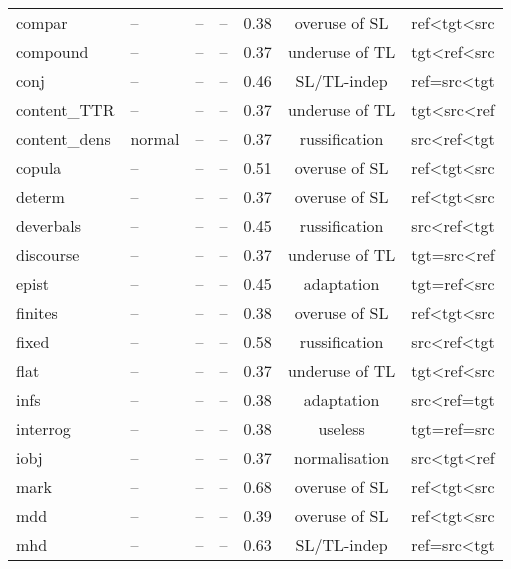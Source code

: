 \begin{longtable}{l|p{2cm}p{2cm}p{1.5cm}ccc}
	compar        & --     & --     & --    & 0.38 & overuse of SL  & ref\textless{}tgt\textless{}src \\
	compound      & --     & --     & --    & 0.37 & underuse of TL  & tgt\textless{}ref\textless{}src \\
	conj          & --     & --     & --    & 0.46 & SL/TL-indep    & ref=src\textless{}tgt           \\
	content\_TTR  & --     & --     & --    & 0.37 & underuse of TL & tgt\textless{}src\textless{}ref \\
	content\_dens & normal & --     & --    & 0.37 & russification  & src\textless{}ref\textless{}tgt \\
	copula        & --     & --     & --    & 0.51 & overuse of SL  & ref\textless{}tgt\textless{}src \\
	determ        & --     & --     & --    & 0.37 & overuse of SL  & ref\textless{}tgt\textless{}src \\
	deverbals     & --     & --     & --    & 0.45 & russification  & src\textless{}ref\textless{}tgt \\
	discourse     & --     & --     & --    & 0.37 & underuse of TL & tgt=src\textless{}ref           \\
	epist         & --     & --     & --    & 0.45 & adaptation     & tgt=ref\textless{}src           \\
	finites       & --     & --     & --    & 0.38 & overuse of SL  & ref\textless{}tgt\textless{}src \\
	fixed         & --     & --     & --    & 0.58 & russification  & src\textless{}ref\textless{}tgt \\
	flat          & --     & --     & --    & 0.37 & underuse of TL  & tgt\textless{}ref\textless{}src \\
	infs          & --     & --     & --    & 0.38 & adaptation     & src\textless{}ref=tgt        \\
	interrog      & --     & --     & --    & 0.38 & useless        & tgt=ref=src                     \\
	iobj          & --     & --     & --    & 0.37 & normalisation  & src\textless{}tgt\textless{}ref \\
	mark          & --     & --     & --    & 0.68 & overuse of SL  & ref\textless{}tgt\textless{}src \\
	mdd           & --     & --     & --    & 0.39 & overuse of SL  & ref\textless{}tgt\textless{}src \\
	mhd           & --     & --     & --    & 0.63 & SL/TL-indep    & ref=src\textless{}tgt           \\

\end{longtable}
